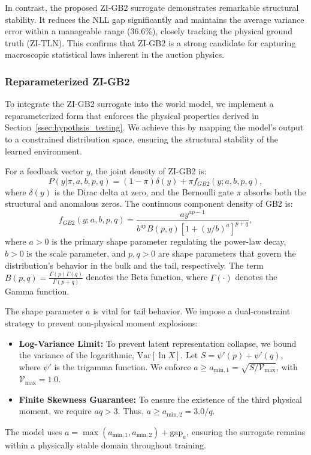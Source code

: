 \documentclass[sigconf, anonymous, review]{acmart}
\begin{document}
In contrast, the proposed ZI-GB2 surrogate demonstrates remarkable structural stability. It reduces the NLL gap significantly and maintains the average variance error within a manageable range ($36.6\%$), closely tracking the physical ground truth (ZI-TLN). This confirms that ZI-GB2 is a strong candidate for capturing macroscopic statistical laws inherent in the auction physics.

\subsubsection{Reparameterized ZI-GB2}

To integrate the ZI-GB2 surrogate into the world model, we implement a reparameterized form that enforces the physical properties derived in Section~\ref{ssec:hypothsis_testing}.
We achieve this by mapping the model's output to a constrained distribution space, ensuring the structural stability of the learned environment.

For a feedback vector $y$, the joint density of ZI-GB2 is:
\begin{equation}
    P(y | \pi, a,b,p,q) = (1 - \pi) \delta(y) + \pi f_{GB2}(y; a, b, p, q),
\end{equation}
where $\delta(y)$ is the Dirac delta at zero, and the Bernoulli gate $\pi$ absorbs both the structural and anomalous zeros. 
The continuous component density of GB2 is:
\begin{equation}
    f_{GB2}(y; a, b, p, q) = \frac{a y^{ap-1}}{b^{ap} B(p, q) [1 + (y/b)^a]^{p+q}},
\end{equation}
where $a > 0$ is the primary shape parameter regulating the power-law decay, $b > 0$ is the scale parameter, and $p, q > 0$ are shape parameters that govern the distribution's behavior in the bulk and the tail, respectively. The term $B(p, q) = \frac{\Gamma(p)\Gamma(q)}{\Gamma(p+q)}$ denotes the Beta function, where $\Gamma(\cdot)$ denotes the Gamma function.

The shape parameter $a$ is vital for tail behavior. We impose a dual-constraint strategy to prevent non-physical moment explosions:
\begin{itemize}
    \item \textbf{Log-Variance Limit:} To prevent latent representation collapse, we bound the variance of the logarithmic, $\text{Var}[\ln X]$. Let $S = \psi'(p) + \psi'(q)$, where $\psi'$ is the trigamma function. We enforce $a \ge a_{\mathrm{min}, 1} = \sqrt{S / \mathcal{V}_{\mathrm{max}}}$, with $\mathcal{V}_{\mathrm{max}} = 1.0$.
    \item \textbf{Finite Skewness Guarantee:} To ensure the existence of the third physical moment, we require $aq > 3$. Thus, $a \ge a_{\mathrm{min}, 2} = 3.0 / q$.
\end{itemize}
The model uses $a = \max(a_{\mathrm{min}, 1}, a_{\mathrm{min}, 2}) + \text{gap}_a$, ensuring the surrogate remains within a physically stable domain throughout training.
\end{document}

